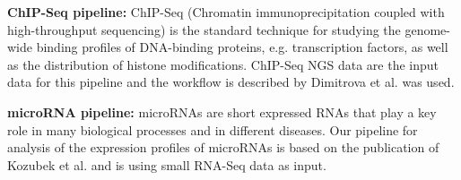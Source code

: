 \textbf{ChIP-Seq pipeline:} ChIP-Seq (Chromatin immunoprecipitation coupled with high-throughput sequencing) is the standard technique for studying the genome-wide binding profiles of DNA-binding proteins, e.g. transcription factors, as well as the distribution of histone modifications. ChIP-Seq NGS data are the input data for this pipeline and the workflow is described by Dimitrova et al. \cite{dimitrova2014pax5} was used.

\textbf{microRNA pipeline:} microRNAs are short expressed RNAs that play a key role in many biological processes and in different diseases. Our pipeline for analysis of the expression profiles of microRNAs is based on the publication of Kozubek et al. \cite{kozubek2013depth} and is using small RNA-Seq data as input.




